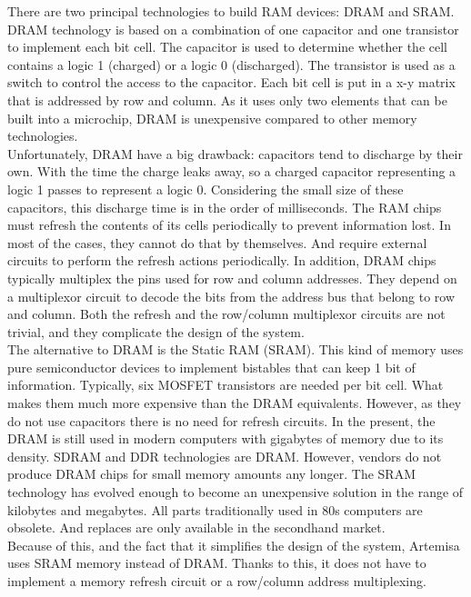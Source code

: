 There are two principal technologies to build RAM devices: DRAM and SRAM. DRAM technology is based on a combination of one capacitor and one transistor to implement each bit cell. The capacitor is used to determine whether the cell contains a logic 1 (charged) or a logic 0 (discharged). The transistor is used as a switch to control the access to the capacitor. Each bit cell is put in a x-y matrix that is addressed by row and column. As it uses only two elements that can be built into a microchip, DRAM is unexpensive compared to other memory technologies. \\

Unfortunately, DRAM have a big drawback: capacitors tend to discharge by their own. With the time the charge leaks away, so a charged capacitor representing a logic 1 passes to represent a logic 0. Considering the small size of these capacitors, this discharge time is in the order of milliseconds. The RAM chips must refresh the contents of its cells periodically to prevent information lost. In most of the cases, they cannot do that by themselves. And require external circuits to perform the refresh actions periodically. In addition, DRAM chips typically multiplex the pins used for row and column addresses. They depend on a multiplexor circuit to decode the bits from the address bus that belong to row and column. Both the refresh and the row/column multiplexor circuits are not trivial, and they complicate the design of the system. \\

The alternative to DRAM is the Static RAM (SRAM). This kind of memory uses pure semiconductor devices to implement bistables that can keep 1 bit of information. Typically, six MOSFET transistors are needed per bit cell. What makes them much more expensive than the DRAM equivalents. However, as they do not use capacitors there is no need for refresh circuits.
In the present, the DRAM is still used in modern computers with gigabytes of memory due to its density. SDRAM and DDR technologies are DRAM. However, vendors do not produce DRAM chips for small memory amounts any longer. The SRAM technology has evolved enough to become an unexpensive solution in the range of kilobytes and megabytes. All parts traditionally used in 80s computers are obsolete. And replaces are only available in the secondhand market. \\

Because of this, and the fact that it simplifies the design of the system, Artemisa uses SRAM memory instead of DRAM. Thanks to this, it does not have to implement a memory refresh circuit or a row/column address multiplexing.

